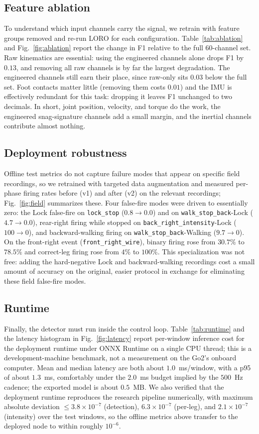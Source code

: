 \subsection{Feature ablation}
To understand which input channels carry the signal, we retrain with feature groups removed and re-run LORO for each configuration. Table~\ref{tab:ablation} and Fig.~\ref{fig:ablation} report the change in F1 relative to the full 60-channel set. Raw kinematics are essential: using the engineered channels alone drops F1 by $0.13$, and removing all raw channels is by far the largest degradation. The engineered channels still earn their place, since raw-only sits $0.03$ below the full set. Foot contacts matter little (removing them costs $0.01$) and the IMU is effectively redundant for this task: dropping it leaves F1 unchanged to two decimals. In short, joint position, velocity, and torque do the work, the engineered snag-signature channels add a small margin, and the inertial channels contribute almost nothing.

\subsection{Deployment robustness}
Offline test metrics do not capture failure modes that appear on specific field recordings, so we retrained with targeted data augmentation and measured per-phase firing rates before (v1) and after (v2) on the relevant recordings; Fig.~\ref{fig:field} summarizes these. Four false-fire modes were driven to essentially zero: the Lock false-fire on \texttt{lock\_stop} ($0.8 \to 0.0$) and on \texttt{walk\_stop\_back}-Lock ($4.7 \to 0.0$), rear-right firing while stopped on \texttt{back\_right\_intensity}-Lock ($100 \to 0$), and backward-walking firing on \texttt{walk\_stop\_back}-Walking ($9.7 \to 0$). On the front-right event (\texttt{front\_right\_wire}), binary firing rose from $30.7\%$ to $78.5\%$ and correct-leg firing rose from $4\%$ to $100\%$. This specialization was not free: adding the hard-negative Lock and backward-walking recordings cost a small amount of accuracy on the original, easier protocol in exchange for eliminating these field false-fire modes.

\subsection{Runtime}
Finally, the detector must run inside the control loop. Table~\ref{tab:runtime} and the latency histogram in Fig.~\ref{fig:latency} report per-window inference cost for the deployment runtime under ONNX Runtime on a single CPU thread; this is a development-machine benchmark, not a measurement on the Go2's onboard computer. Mean and median latency are both about $1.0$~ms/window, with a p95 of about $1.3$~ms, comfortably under the $2.0$~ms budget implied by the $500$~Hz cadence; the exported model is about $0.5$~MB. We also verified that the deployment runtime reproduces the research pipeline numerically, with maximum absolute deviation $\leq 3.8\times10^{-7}$ (detection), $6.3\times10^{-7}$ (per-leg), and $2.1\times10^{-7}$ (intensity) over the test windows, so the offline metrics above transfer to the deployed node to within roughly $10^{-6}$.